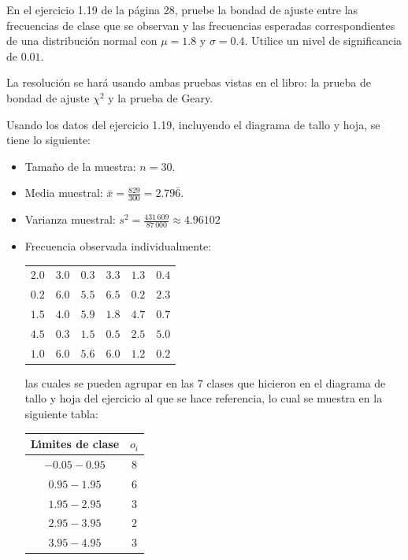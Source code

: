 \begin{enunciado}
 En el ejercicio 1.19 de la p\'agina 28, pruebe la bondad de ajuste
 entre las frecuencias de clase que se observan
 y las frecuencias esperadas correspondientes de una distribuci\'on normal
 con $\mu = 1.8$ y $\sigma = 0.4$.
 Utilice un nivel de significancia de $0.01$.
\end{enunciado}

\begin{solucion}
 La resoluci\'on se har\'a usando ambas pruebas vistas en el libro:
 la prueba de bondad de ajuste $\chi^2$ y la prueba de Geary.
 \begin{datos}
  Usando los datos del ejercicio 1.19, incluyendo el diagrama de tallo y hoja, 
  se tiene lo siguiente:
  \begin{itemize}
   \item Tama\~no de la muestra: $n=30$.
   \item Media muestral: $\bar{x} = \frac{829}{300} = 2.79\bar{6}$.
   \item Varianza muestral:
   $s^2 = \frac{431\,609}{87\,000} \approx 4.96102$
   \item Frecuencia observada individualmente:
   \begin{center}
    \begin{tabular}{cccccc}
     $2.0$ & $3.0$ & $0.3$ & $3.3$ & $1.3$ & $0.4$ \\
     $0.2$ & $6.0$ & $5.5$ & $6.5$ & $0.2$ & $2.3$ \\
     $1.5$ & $4.0$ & $5.9$ & $1.8$ & $4.7$ & $0.7$ \\
     $4.5$ & $0.3$ & $1.5$ & $0.5$ & $2.5$ & $5.0$ \\
     $1.0$ & $6.0$ & $5.6$ & $6.0$ & $1.2$ & $0.2$ 
    \end{tabular}
   \end{center}
   las cuales se pueden agrupar en las $7$ clases que hicieron
   en el diagrama de tallo y hoja del ejercicio al que se hace referencia, 
   lo cual se muestra en la siguiente tabla:
   \begin{center}
    \begin{tabular}{cc}
     \hline 
     \textbf{L\'{\i}mites de clase} & $o_i$ \\
     \hline 
     $-0.05 - 0.95$ &  $8$ \\
     $0.95 - 1.95$ & $6$ \\
     $1.95 - 2.95$ & $3$ \\
     $2.95 - 3.95$ & $2$ \\
     $3.95 - 4.95$ & $3$ \\

\end{tabular}
\end{center}
\end{itemize}
\end{datos}
\end{solucion}
